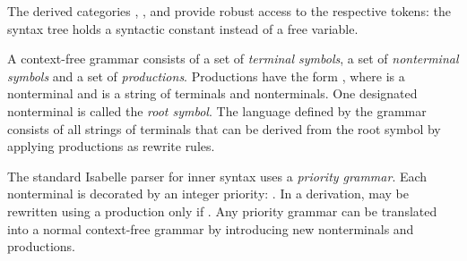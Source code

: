 \begin{isabellebody}
\begin{isamarkuptext}
  The derived categories \hypertarget{syntax.inner.num-const}{\hyperlink{syntax.inner.num-const}{\mbox{}}}, \hypertarget{syntax.inner.float-const}{\hyperlink{syntax.inner.float-const}{\mbox{}}}, and \hypertarget{syntax.inner.num-const}{\hyperlink{syntax.inner.num-const}{\mbox{}}} provide
  robust access to the respective tokens: the syntax tree holds a
  syntactic constant instead of a free variable.%
\end{isamarkuptext}%
\isamarkuptrue%
%
\isamarkuptrue%
%
\begin{isamarkuptext}%
A context-free grammar consists of a set of \emph{terminal
  symbols}, a set of \emph{nonterminal symbols} and a set of
  \emph{productions}.  Productions have the form ,
  where  is a nonterminal and  is a string of
  terminals and nonterminals.  One designated nonterminal is called
  the \emph{root symbol}.  The language defined by the grammar
  consists of all strings of terminals that can be derived from the
  root symbol by applying productions as rewrite rules.

  The standard Isabelle parser for inner syntax uses a \emph{priority
  grammar}.  Each nonterminal is decorated by an integer priority:
  .  In a derivation,  may be rewritten
  using a production  only if .  Any
  priority grammar can be translated into a normal context-free
  grammar by introducing new nonterminals and productions.


\end{isamarkuptext}
\end{isabellebody}
